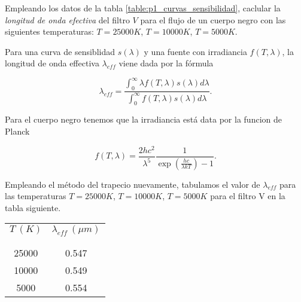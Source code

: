 \documentclass[12pt,a4paper]{practice}
\newcommand\integrate[4]{%
    \int_{#3}^{#4} {#1 d #2}
}
\begin{document}
    \newpage
    \begin{problem}\label{prob:2}
        Empleando los datos de la tabla \ref{table:p1_curvas_sensibilidad}, caclular la \emph{longitud de onda efectiva} del filtro $V$ para el flujo de un cuerpo negro con las siguientes temperaturas: $T = 25000 K$, $T = 10000 K$, $T = 5000 K$.

        \begin{solution}
            Para una curva de sensiblidad $s\left(\lambda \right)$ y una fuente con irradiancia $f(T, \lambda)$, la longitud de onda effectiva $\lambda_{eff}$ viene dada por la fórmula

            \begin{equation}\label{eq:effective_wavelength}
                \lambda_{eff} = \frac{\displaystyle\integrate{\lambda f(T, \lambda) s(\lambda)}{\lambda}{0}{\infty} }{\displaystyle\integrate{f(T, \lambda) s(\lambda)}{\lambda}{0}{\infty}}.
            \end{equation}

            Para el cuerpo negro tenemos que la irradiancia está data por la funcion de Planck

            \begin{equation}\label{eq:plank_irradiance}
                f(T, \lambda) = \frac{2 h c^2}{\lambda^5}\frac{1}{\exp(\frac{h c}{\lambda k T}) - 1}.
            \end{equation}

            Empleando el método del trapecio nuevamente, tabulamos el valor de $\lambda_{eff}$ para las temperaturas $T = 25000 K$, $T = 10000 K$, $T = 5000 K$ para el filtro V en la tabla siguiente.

            \begin{table}[h!]
                \centering
                \begin{tabular}{ c c }
                    \hline
                    $T\ (K)$  & $\lambda_{eff}\ (\mu m)$                    %
                    \rule{0pt}{2.6ex}\rule[-1.2ex]{0pt}{0pt}\\
                     & \\[-1.05em]\hline
                     & \\[-1.05em]
                    25000  & 0.547 \\
                    10000  & 0.549 \\
                    5000   & 0.554 \\
                    \hline
                \end{tabular}
            \end{table}
        \end{solution}
    \end{problem}
\end{document}
